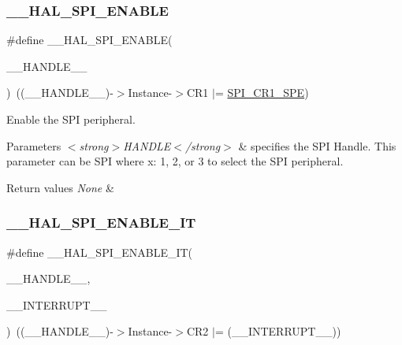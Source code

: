 \subsubsection{\texorpdfstring{\+\_\+\+\_\+\+H\+A\+L\+\_\+\+S\+P\+I\+\_\+\+E\+N\+A\+B\+LE}{\_\_HAL\_SPI\_ENABLE}}
{\footnotesize\ttfamily \#define \+\_\+\+\_\+\+H\+A\+L\+\_\+\+S\+P\+I\+\_\+\+E\+N\+A\+B\+LE(\begin{DoxyParamCaption}\item[{}]{\+\_\+\+\_\+\+H\+A\+N\+D\+L\+E\+\_\+\+\_\+ }\end{DoxyParamCaption})~((\+\_\+\+\_\+\+H\+A\+N\+D\+L\+E\+\_\+\+\_\+)-\/$>$Instance-\/$>$C\+R1 $\vert$=  \hyperlink{group___peripheral___registers___bits___definition_gac5a646d978d3b98eb7c6a5d95d75c3f9}{S\+P\+I\+\_\+\+C\+R1\+\_\+\+S\+PE})}



Enable the S\+PI peripheral. 


\begin{DoxyParams}{Parameters}
{\em $<$strong$>$\+H\+A\+N\+D\+L\+E$<$/strong$>$} & specifies the S\+PI Handle. This parameter can be S\+PI where x\+: 1, 2, or 3 to select the S\+PI peripheral. \\
\hline
\end{DoxyParams}

\begin{DoxyRetVals}{Return values}
{\em None} & \\
\hline
\end{DoxyRetVals}
\mbox{\label{group___s_p_i___exported___macros_ga76064652f6f56d8868720b5541e854f5}} 
\subsubsection{\texorpdfstring{\+\_\+\+\_\+\+H\+A\+L\+\_\+\+S\+P\+I\+\_\+\+E\+N\+A\+B\+L\+E\+\_\+\+IT}{\_\_HAL\_SPI\_ENABLE\_IT}}
{\footnotesize\ttfamily \#define \+\_\+\+\_\+\+H\+A\+L\+\_\+\+S\+P\+I\+\_\+\+E\+N\+A\+B\+L\+E\+\_\+\+IT(\begin{DoxyParamCaption}\item[{}]{\+\_\+\+\_\+\+H\+A\+N\+D\+L\+E\+\_\+\+\_\+,  }\item[{}]{\+\_\+\+\_\+\+I\+N\+T\+E\+R\+R\+U\+P\+T\+\_\+\+\_\+ }\end{DoxyParamCaption})~((\+\_\+\+\_\+\+H\+A\+N\+D\+L\+E\+\_\+\+\_\+)-\/$>$Instance-\/$>$C\+R2 $\vert$= (\+\_\+\+\_\+\+I\+N\+T\+E\+R\+R\+U\+P\+T\+\_\+\+\_\+))}



